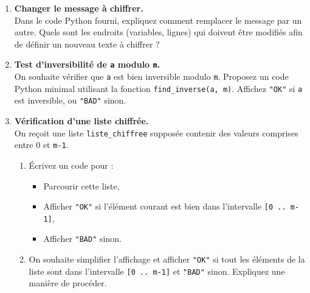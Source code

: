 \documentclass[12pt,a4paper]{article}
\begin{document}
\begin{enumerate}

  \item \textbf{Changer le message à chiffrer.}\\
  Dans le code Python fourni, expliquez comment remplacer le message par un autre.  
  Quels sont les endroits (variables, lignes) qui doivent être modifiés afin de définir un nouveau texte à chiffrer ?


  \item \textbf{Test d’inversibilité de \texttt{a} modulo \texttt{m}.}\\
  On souhaite vérifier que \texttt{a} est bien inversible modulo \texttt{m}.  
  Proposez un code Python minimal utilisant la fonction \texttt{find\_inverse(a, m)}.  
  Affichez \texttt{"OK"} si \texttt{a} est inversible, ou \texttt{"BAD"} sinon.

  \item \textbf{Vérification d’une liste chiffrée.}\\
  On reçoit une liste \verb|liste_chiffree| supposée contenir des valeurs comprises entre 0 et \texttt{m-1}.
  \begin{enumerate}
    \item Écrivez un code pour :
      \begin{itemize}
        \item Parcourir cette liste,
        \item Afficher \texttt{"OK"} si l’élément courant est bien dans l’intervalle \texttt{[0 .. m-1]},
        \item Afficher \texttt{"BAD"} sinon.
      \end{itemize}
    \item On souhaite simplifier l'affichage et afficher \texttt{"OK"} si tout les éléments de la liste sont dans l'intervalle \texttt{[0 .. m-1]} et \texttt{"BAD"} sinon. Expliquez une manière de procéder.
  \end{enumerate}



\end{enumerate}
\end{document}
